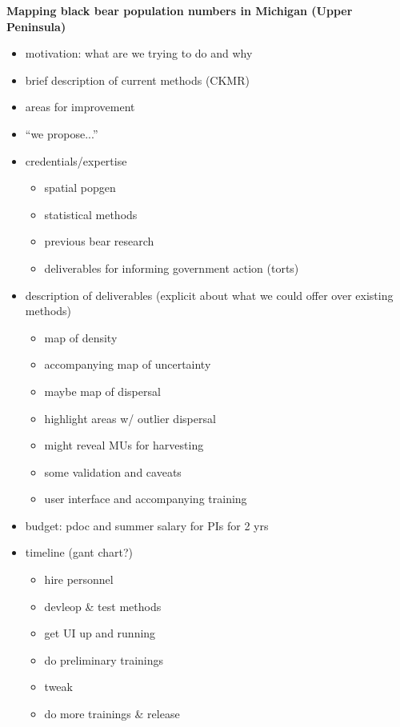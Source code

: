 \documentclass[12pt]{article}
\begin{document}
%
\begin{center}
\textbf{Mapping black bear population numbers in Michigan (Upper Peninsula)}
\end{center}
%            
\begin{itemize}
\item motivation: what are we trying to do and why
\item brief description of current methods (CKMR)
\item areas for improvement
\item ``we propose...''
\item credentials/expertise 
\begin{itemize}
\item spatial popgen
\item statistical methods
\item previous bear research
\item deliverables for informing government action (torts)
\end{itemize}
\item description of deliverables (explicit about what we could offer over existing methods)
\begin{itemize}
\item map of density
\item accompanying map of uncertainty
\item maybe map of dispersal
\item highlight areas w/ outlier dispersal
\item might reveal MUs for harvesting
\item some validation and caveats
\item user interface and accompanying training 
\end{itemize}
\item budget: pdoc and summer salary for PIs for 2 yrs
\item timeline (gant chart?)
\begin{itemize}
\item hire personnel
\item devleop \& test methods
\item get UI up and running
\item do preliminary trainings
\item tweak
\item do more trainings \& release
\end{itemize}
\end{itemize}

\clearpage
%
\end{document}
